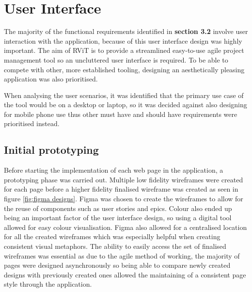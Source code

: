 \documentclass[l4proj.tex]{subfiles}
\begin{document}



\section{User Interface}
The majority of the functional requirements identified in \textbf{section 3.2} involve user interaction with the application, because of this user interface design was highly important. The aim of RViT is to provide a streamlined easy-to-use agile project management tool so an uncluttered user interface is required. To be able to compete with other, more established tooling, designing an aesthetically pleasing application was also prioritised. 

When analysing the user scenarios, it was identified that the primary use case of the tool would be on a desktop or laptop, so it was decided against also designing for mobile phone use thus other must have and should have requirements were prioritised instead.


\subsection{Initial prototyping}
Before starting the implementation of each web page in the application, a prototyping phase was carried out. Multiple low fidelity wireframes were created for each page before a higher fidelity finalised wireframe was created as seen in figure \ref{fig:figma designs}. Figma was chosen to create the wireframes to allow for the reuse of components such as user stories and epics. Colour also ended up being an important factor of the user interface design, so using a digital tool allowed for easy colour visualisation. Figma also allowed for a centralised location for all the created wireframes which was especially helpful when creating consistent visual metaphors. The ability to easily access the set of finalised wireframes was essential as due to the agile method of working, the majority of pages were designed asynchronously so being able to compare newly created designs with previously created ones allowed the maintaining of a consistent page style through the application. 
\end{document}
